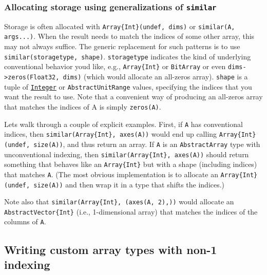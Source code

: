 \hypertarget{8664586686165592487}{}


\subsubsection{Allocating storage using generalizations of \texttt{similar}}



Storage is often allocated with \texttt{Array\{Int\}(undef, dims)} or \texttt{similar(A, args...)}. When the result needs to match the indices of some other array, this may not always suffice. The generic replacement for such patterns is to use \texttt{similar(storagetype, shape)}.  \texttt{storagetype} indicates the kind of underlying {\textquotedbl}conventional{\textquotedbl} behavior you{\textquotesingle}d like, e.g., \texttt{Array\{Int\}} or \texttt{BitArray} or even \texttt{dims->zeros(Float32, dims)} (which would allocate an all-zeros array). \texttt{shape} is a tuple of \hyperlink{8469131683393450448}{\texttt{Integer}} or \texttt{AbstractUnitRange} values, specifying the indices that you want the result to use. Note that a convenient way of producing an all-zeros array that matches the indices of A is simply \texttt{zeros(A)}.



Let{\textquotesingle}s walk through a couple of explicit examples. First, if \texttt{A} has conventional indices, then \texttt{similar(Array\{Int\}, axes(A))} would end up calling \texttt{Array\{Int\}(undef, size(A))}, and thus return an array.  If \texttt{A} is an \texttt{AbstractArray} type with unconventional indexing, then \texttt{similar(Array\{Int\}, axes(A))} should return something that {\textquotedbl}behaves like{\textquotedbl} an \texttt{Array\{Int\}} but with a shape (including indices) that matches \texttt{A}.  (The most obvious implementation is to allocate an \texttt{Array\{Int\}(undef, size(A))} and then {\textquotedbl}wrap{\textquotedbl} it in a type that shifts the indices.)



Note also that \texttt{similar(Array\{Int\}, (axes(A, 2),))} would allocate an \texttt{AbstractVector\{Int\}} (i.e., 1-dimensional array) that matches the indices of the columns of \texttt{A}.



\hypertarget{4699181205936675892}{}


\subsection{Writing custom array types with non-1 indexing}



